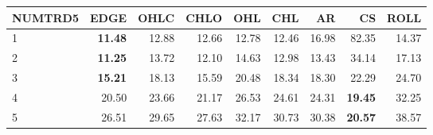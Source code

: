 \begin{table}[ht]
\centering
\begin{tabular}{lrrrrrrrr}
  \hline
NUMTRD5 & EDGE & OHLC & CHLO & OHL & CHL & AR & CS & ROLL \\ 
  \hline
1 & \textbf{11.48} & 12.88 & 12.66 & 12.78 & 12.46 & 16.98 & 82.35 & 14.37 \\ 
  2 & \textbf{11.25} & 13.72 & 12.10 & 14.63 & 12.98 & 13.43 & 34.14 & 17.13 \\ 
  3 & \textbf{15.21} & 18.13 & 15.59 & 20.48 & 18.34 & 18.30 & 22.29 & 24.70 \\ 
  4 & 20.50 & 23.66 & 21.17 & 26.53 & 24.61 & 24.31 & \textbf{19.45} & 32.25 \\ 
  5 & 26.51 & 29.65 & 27.63 & 32.17 & 30.73 & 30.38 & \textbf{20.57} & 38.57 \\ 
   \hline
\end{tabular}
\end{table}
